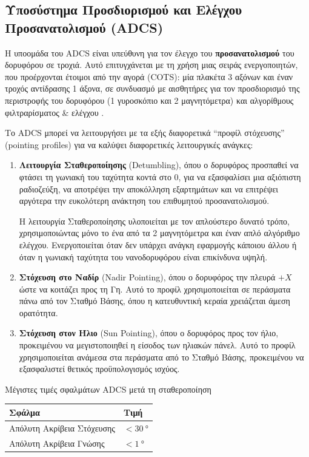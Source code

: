 \documentclass[a4paper,nobib]{tufte-book}
\begin{document}
\subsection{Υποσύστημα Προσδιορισμού και Ελέγχου Προσανατολισμού (\acs{ADCS})}
\label{sec:adcs}

Η υποομάδα του \ac{ADCS} είναι υπεύθυνη για τον έλεγχο του \textbf{προσανατολισμού} του δορυφόρου σε τροχιά. Αυτό επιτυγχάνεται με τη χρήση μιας σειράς ενεργοποιητών, που προέρχονται έτοιμοι από την αγορά (\ac{COTS}): μία πλακέτα 3 αξόνων και έναν τροχός αντίδρασης 1 άξονα, σε συνδυασμό με αισθητήρες για τον προσδιορισμό της περιστροφής του δορυφόρου (1 γυροσκόπιο και 2 μαγνητόμετρα) και αλγορίθμους φιλτραρίσματος \& ελέγχου \autocite{DDJF_AOCS,velentzas_design_attitude_2021}.

Το \ac{ADCS} μπορεί να λειτουργήσει με τα εξής διαφορετικά ``προφίλ στόχευσης'' (pointing profiles) για να καλύψει διαφορετικές λειτουργικές ανάγκες:
\begin{enumerate}
	\item \textbf{Λειτουργία Σταθεροποίησης} (Detumbling), όπου ο δορυφόρος προσπαθεί να φτάσει τη γωνιακή του ταχύτητα κοντά στο 0, για να εξασφαλίσει μια αξιόπιστη ραδιοζεύξη, να αποτρέψει την αποκόλληση εξαρτημάτων και να επιτρέψει αργότερα την ευκολότερη ανάκτηση του επιθυμητού προσανατολισμού.
	
	Η λειτουργία Σταθεροποίησης υλοποιείται με τον απλούστερο δυνατό τρόπο, χρησιμοποιώντας μόνο το ένα από τα 2 μαγνητόμετρα και έναν απλό αλγόριθμο ελέγχου. Ενεργοποιείται όταν δεν υπάρχει ανάγκη εφαρμογής κάποιου άλλου ή όταν η γωνιακή ταχύτητα του νανοδορυφόρου είναι επικίνδυνα υψηλή.
	
	\item \textbf{Στόχευση στο Ναδίρ} (Nadir Pointing), όπου ο δορυφόρος  την πλευρά \(+X\) ώστε να κοιτάζει προς τη Γη. Αυτό το προφίλ χρησιμοποιείται σε περάσματα πάνω από τον Σταθμό Βάσης, όπου η κατευθυντική κεραία χρειάζεται άμεση ορατότητα.
	
	\item \textbf{Στόχευση στον Ήλιο} (Sun Pointing), όπου ο δορυφόρος  προς τον ήλιο, προ\-κει\-μέ\-νου να μεγιστοποιηθεί η είσοδος των ηλιακών πάνελ. Αυτό το προφίλ χρησιμοποιείται ανάμεσα στα περάσματα από το Σταθμό Βάσης, προκειμένου να εξασφαλιστεί θετικός προϋπολογισμός ισχύος.
\end{enumerate}

\begin{margintable}
	\centering
	\caption[Μέγιστες τιμές σφαλμάτων ADCS μετά τη σταθεροποίηση]{Μέγιστες τιμές σφαλμάτων \ac{ADCS} μετά τη σταθεροποίηση}
	\label{tab:adcsape}
	\begin{tabular}{@{}ll@{}}
		\toprule
		Σφάλμα                      & Τιμή                    \\ \midrule
		Απόλυτη Ακρίβεια Στόχευσης & \( < \SI{30}{\degree} \) \\
		Απόλυτη Ακρίβεια Γνώσης    & \( < \SI{1}{\degree} \) 
	\end{tabular}
\end{margintable}
\end{document}
